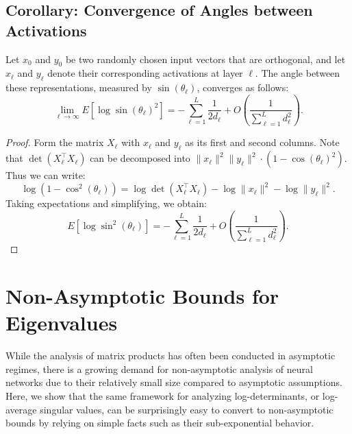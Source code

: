 \subsection{Corollary: Convergence of Angles between Activations}

\begin{corollary}
Let \( x_0 \) and \( y_0 \) be two randomly chosen input vectors that are orthogonal, and let \( x_\ell \) and \( y_\ell \) denote their corresponding activations at layer \( \ell \). The angle between these representations, measured by \( \sin(\theta_\ell) \), converges as follows:
\begin{equation}
\lim_{\ell\to\infty} E \left[\log \sin(\theta_\ell)^2\right] =  -\sum_{\ell=1}^L \frac{1}{2d_\ell} + O\left(\frac{1}{\sum_{\ell=1}^L d_\ell^2}\right).
\end{equation}
\end{corollary}

\begin{proof}
Form the matrix \( X_\ell \) with \( x_\ell \) and \( y_\ell \) as its first and second columns. Note that \( \det(X_\ell^\top X_\ell) \) can be decomposed into \( \|x_\ell\|^2\|y_\ell\|^2 \cdot (1-\cos(\theta_\ell)^2) \). Thus we can write:
\begin{equation}
\log(1-\cos^2(\theta_\ell)) = \log \det(X_\ell^\top X_\ell) - \log\|x_\ell\|^2 - \log\|y_\ell\|^2.
\end{equation}
Taking expectations and simplifying, we obtain:
\begin{equation}
E \left[\log \sin^2(\theta_\ell)\right] =  -\sum_{\ell=1}^L \frac{1}{2d_\ell} + O\left(\frac{1}{\sum_{\ell=1}^L d_\ell^2}\right).
\end{equation}
\end{proof}

\section{Non-Asymptotic Bounds for Eigenvalues}

\begin{remark}
While the analysis of matrix products has often been conducted in asymptotic regimes, there is a growing demand for non-asymptotic analysis of neural networks due to their relatively small size compared to asymptotic assumptions. Here, we show that the same framework for analyzing log-determinants, or log-average singular values, can be surprisingly easy to convert to non-asymptotic bounds by relying on simple facts such as their sub-exponential behavior.
\end{remark}

